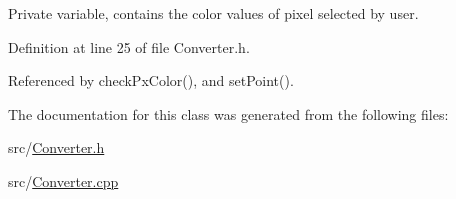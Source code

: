Private variable, contains the color values of pixel selected by user. 



Definition at line 25 of file Converter.\+h.



Referenced by check\+Px\+Color(), and set\+Point().



The documentation for this class was generated from the following files\+:\begin{DoxyCompactItemize}
\item 
src/\mbox{\hyperlink{_converter_8h}{Converter.\+h}}\item 
src/\mbox{\hyperlink{_converter_8cpp}{Converter.\+cpp}}\end{DoxyCompactItemize}
